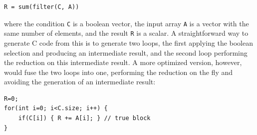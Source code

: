 \begin{small}
\begin{Verbatim}[xleftmargin=.3\columnwidth]
R = sum(filter(C, A))
\end{Verbatim}
\end{small}


\noindent{}where the condition \texttt{C} is a boolean vector, the input array \texttt{A}
is a vector with the same number of elements, and the result \texttt{R} is a
scalar.  A straightforward way to generate C code from this is to generate two loops, the first applying the boolean selection and producing an intermediate result, and the second loop performing the reduction on this intermediate result.  A more optimized version, however, would fuse the two loops into one, performing the reduction on the fly and avoiding the generation of an intermediate result:


\begin{small}
\begin{Verbatim}[xleftmargin=.15\columnwidth]
R=0;
for(int i=0; i<C.size; i++) {
    if(C[i]) { R += A[i]; } // true block
}
\end{Verbatim}
\end{small}



